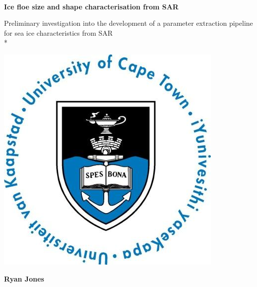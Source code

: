 \documentclass[a4paper, 11pt, oneside, openright, parskip=full]{book}
\newcommand{\auth}{Ryan Jones}							%
\newcommand{\titl}{Ice floe size and shape characterisation from SAR}						%
\newcommand{\subtitle}{Preliminary investigation into the development of a parameter extraction pipeline for sea ice characteristics from SAR}						%
\newcommand{\logo}										%
{	
	\includegraphics[scale = 0.3]{Figures/FrontMatter/uctLogo.png}
}
\begin{document}
\begin{titlepage}
	\centering
	\ \\
		\vskip 25pt	

	\begin{Huge}					
		\textbf{\titl}
		\vskip 25pt
	\end{Huge}
	\begin{Large}					
		\subtitle\\*
		\vskip 30pt
	\end{Large}
	\logo							
	\vskip 30pt	
	\begin{Large}					
		\textbf{\auth}\\
	\end{Large}
	

\end{titlepage}
\end{document}
